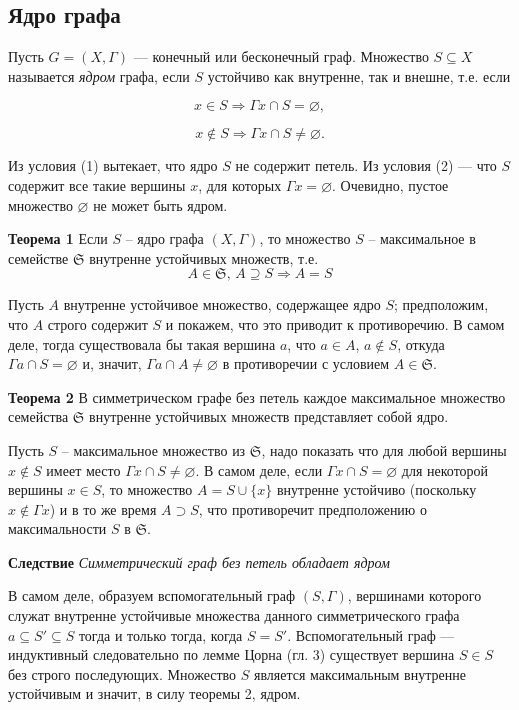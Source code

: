 \subsection{Ядро графа}

Пусть $G = (X, \Gamma)$ — конечный или бесконечный граф. Множество $S \subseteq X$ называется \textit{ядром} графа, если $S$ устойчиво как внутренне, так и внешне, т.е. если

\begin{equation}
x \in S \Rightarrow \Gamma x \cap S = \varnothing,
\end{equation}

\begin{equation}
x \notin S \Rightarrow \Gamma x \cap S \neq \varnothing.
\end{equation}

Из условия (1) вытекает, что ядро $S$ не содержит петель. Из условия (2) — что $S$ содержит все такие вершины $x$, для которых $\Gamma x = \varnothing$. Очевидно, пустое множество $\varnothing$ не может быть ядром.

\textbf{Теорема 1} Если $S$ -- ядро графа $(X, \Gamma)$, то множество $S$ -- максимальное в семействе $\mathfrak{S}$ внутренне устойчивых множеств, т.е.
\[
A \in \mathfrak{S}, \, A \supseteq S \Rightarrow A = S
\]

Пусть $A$ внутренне устойчивое множество, содержащее ядро $S$; предположим, что $A$ строго содержит $S$ и покажем, что это приводит к противоречию. В самом деле, тогда существовала бы такая вершина $a$, что $a \in A$, $a \notin S$, откуда $\Gamma a \cap S = \varnothing$ и, значит, $\Gamma a \cap A \neq \varnothing$ в противоречии с условием $A \in \mathfrak{S}$.

\textbf{Теорема 2} В симметрическом графе без петель каждое максимальное множество семейства $\mathfrak{S}$ внутренне устойчивых множеств представляет собой ядро.

Пусть $S$ -- максимальное множество из $\mathfrak{S}$, надо показать что для любой вершины $x \notin S$ имеет место $\Gamma x \cap S \neq \varnothing$. В самом деле, если $\Gamma x \cap S = \varnothing$ для некоторой вершины $x \in S$, то множество $A = S \cup \{x\}$ внутренне устойчиво (поскольку $x \notin \Gamma x$) и в то же время $A \supset S$, что противоречит предположению о максимальности $S$ в $\mathfrak{S}$.

\textbf{Следствие} \textit{Симметрический граф без петель обладает ядром}

В самом деле, образуем вспомогательный граф $(S, \Gamma)$, вершинами которого служат внутренне устойчивые множества данного симметрического графа $a \subseteq S' \subseteq S$ тогда и только тогда, когда $S = S'$. Вспомогательный граф --- индуктивный следовательно по лемме Цорна (гл. 3) существует вершина $S \in S$ без строго последующих. Множество $S$ является максимальным внутренне устойчивым и значит, в силу теоремы 2, ядром.

